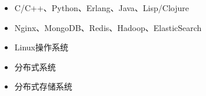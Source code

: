   \begin{itemize}[leftmargin=*]
    \item C/C++、Python、Erlang、Java、Lisp/Clojure
    \item Nginx、MongoDB、Redis、Hadoop、ElasticSearch
    \item Linux操作系统
    \item 分布式系统
    \item 分布式存储系统
  \end{itemize}
